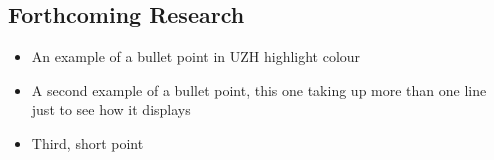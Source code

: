 \documentclass[a0,portrait]{a0poster}
\begin{document}
\begin{multicols}{3}

\section{Forthcoming Research}

\blindtext
\color{uzhockerrot100}
\begin{itemize}
 \item An example of a bullet point in UZH highlight colour
 \item A second example of a bullet point, this one taking up more than one line just to see how it displays
 \item Third, short point
\end{itemize}
\color{Black}

\singlespacing
\small
\nocite{*} %


\end{multicols}
\end{document}
